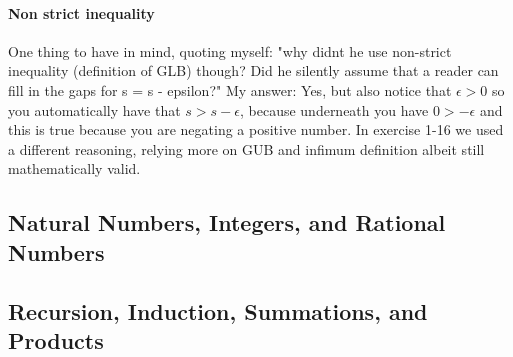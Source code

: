 \documentclass{article}
\begin{document}
\paragraph*{Non strict inequality}

One thing to have in mind, quoting myself: "why didnt he use non-strict inequality (definition of GLB) though?
Did he silently assume that a reader can fill in the gaps for s = s - epsilon?"
\newline
My answer: Yes, but also notice that \(\epsilon > 0\) so you automatically have that \(s > s - \epsilon\),
because underneath you have \(0 > - \epsilon\) and this is true because you are negating a positive number.
In exercise 1-16 we used a different reasoning, relying more on GUB and infimum definition albeit still
mathematically valid. 

\subsection{Natural Numbers, Integers, and Rational Numbers}
\subsection{Recursion, Induction, Summations, and Products}
\end{document}
